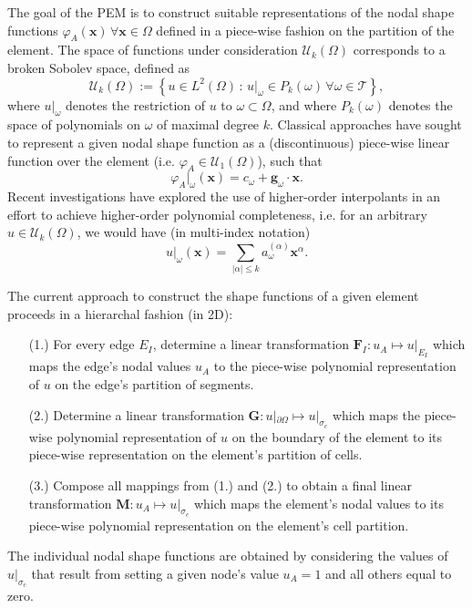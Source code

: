 The goal of the PEM is to construct suitable representations of the nodal shape functions $\varphi_A (\mathbf{x}) \, \forall \mathbf{x} \in \Omega$ defined in a piece-wise fashion on the partition of the element. The space of functions under consideration $\mathcal{U}_k (\Omega)$ corresponds to a broken Sobolev space, defined as
\begin{equation}
        \mathcal{U}_k (\Omega) := \left\{ u \in L^2 (\Omega) \, : \, u |_{\omega} \in P_k (\omega) \, \forall \omega \in \mathcal{T} \right\},
\end{equation}
where $u|_\omega$ denotes the restriction of $u$ to $\omega \subset \Omega$, and where $P_k (\omega)$ denotes the space of polynomials on $\omega$ of maximal degree $k$. Classical approaches have sought to represent a given nodal shape function as a (discontinuous) piece-wise linear function over the element (i.e. $\varphi_A \in \mathcal{U}_1 (\Omega)$), such that
\begin{equation}
     \varphi_A |_\omega (\mathbf{x}) = c_{\omega} + \mathbf{g}_{\omega} \cdot \mathbf{x}.
\end{equation}
Recent investigations have explored the use of higher-order interpolants in an effort to achieve higher-order polynomial completeness, i.e. for an arbitrary $u \in \mathcal{U}_k (\Omega)$, we would have (in multi-index notation)
\begin{equation}
     u |_\omega (\mathbf{x}) = \sum_{|\alpha| \leq k} a_{\omega}^{(\alpha)} \mathbf{x}^{\alpha}.
\end{equation}

The current approach to construct the shape functions of a given element proceeds in a hierarchal fashion (in 2D):
\begin{itemize}
        \item[(1.)] For every edge $E_I$, determine a linear transformation $\mathbf{F}_I : u_A \mapsto u|_{E_I}$ which maps the edge's nodal values $u_A$ to the piece-wise polynomial representation of $u$ on the edge's partition of segments.
        \item[(2.)] Determine a linear transformation $\mathbf{G} : u|_{\partial \Omega} \mapsto u|_{\sigma_c}$ which maps the piece-wise polynomial representation of $u$ on the boundary of the element to its piece-wise representation on the element's partition of cells.
        \item[(3.)] Compose all mappings from (1.) and (2.) to obtain a final linear transformation $\mathbf{M} : u_A \mapsto u|_{\sigma_c}$ which maps the element's nodal values to its piece-wise polynomial representation on the element's cell partition.
\end{itemize}
The individual nodal shape functions are obtained by considering the values of $ u|_{\sigma_c}$ that result from setting a given node's value $u_A = 1$ and all others equal to zero.

